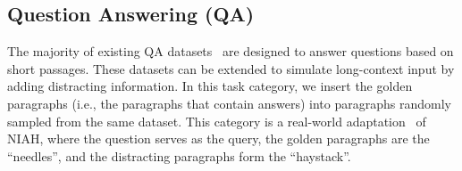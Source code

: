 \subsection{Question Answering (QA)}
The majority of existing QA datasets~\citep{squad, hotpotqa, musique} are designed to answer questions based on short passages. These datasets can be extended to simulate long-context input by adding distracting information. In this task category, we insert the golden paragraphs (i.e., the paragraphs that contain answers) into paragraphs randomly sampled from the same dataset. This category is a real-world adaptation~\citep{sled} of NIAH, where the question serves as the query, the golden paragraphs are the ``needles'', and the distracting paragraphs form the ``haystack''.









